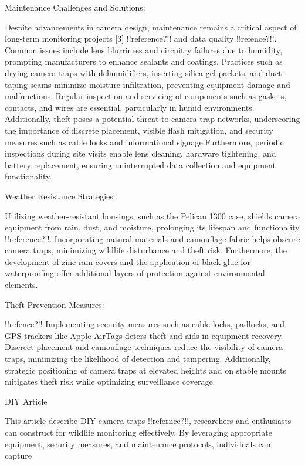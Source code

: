 \documentclass[class=report,11pt,crop=false]{standalone}
\begin{document}
 

Maintenance Challenges and Solutions: 

Despite advancements in camera design, maintenance remains a critical aspect of long-term monitoring projects [3] !!reference?!! and data quality !!refence?!!. Common issues include lens blurriness and circuitry failures due to humidity, prompting manufacturers to enhance sealants and coatings. Practices such as drying camera traps with dehumidifiers, inserting silica gel packets, and duct-taping seams minimize moisture infiltration, preventing equipment damage and malfunctions.  Regular inspection and servicing of components such as gaskets, contacts, and wires are essential, particularly in humid environments. Additionally, theft poses a potential threat to camera trap networks, underscoring the importance of discrete placement, visible flash mitigation, and security measures such as cable locks and informational signage.Furthermore, periodic inspections during site visits enable lens cleaning, hardware tightening, and battery replacement, ensuring uninterrupted data collection and equipment functionality. 

 

 

Weather Resistance Strategies: 

Utilizing weather-resistant housings, such as the Pelican 1300 case, shields camera equipment from rain, dust, and moisture, prolonging its lifespan and functionality !!reference?!!. Incorporating natural materials and camouflage fabric helps obscure camera traps, minimizing wildlife disturbance and theft risk. Furthermore, the development of zinc rain covers and the application of black glue for waterproofing offer additional layers of protection against environmental elements. 

 

Theft Prevention Measures: 

!!refence?!! Implementing security measures such as cable locks, padlocks, and GPS trackers like Apple AirTags deters theft and aids in equipment recovery. Discreet placement and camouflage techniques reduce the visibility of camera traps, minimizing the likelihood of detection and tampering. Additionally, strategic positioning of camera traps at elevated heights and on stable mounts mitigates theft risk while optimizing surveillance coverage. 


DIY Article 

This article describe DIY camera traps !!refernce?!!, researchers and enthusiasts can construct for wildlife monitoring effectively. By leveraging appropriate equipment, security measures, and maintenance protocols, individuals can capture  
\end{document}
